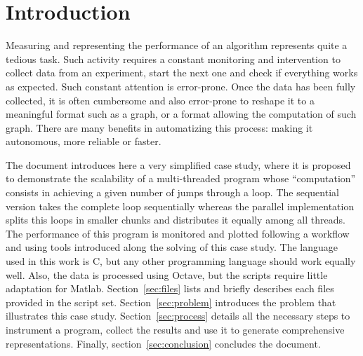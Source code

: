 \section{Introduction}
Measuring and representing the performance of an algorithm represents quite a tedious task. Such activity requires a constant monitoring and intervention to collect data from an experiment, start the next one and check if everything works as expected. Such constant attention is error-prone. Once the data has been fully collected, it is often cumbersome and also error-prone to reshape it to a meaningful format such as a graph, or a format allowing the computation of such graph. There are many benefits in automatizing this process: making it autonomous, more reliable or faster.

The document introduces here a very simplified case study, where it is proposed to demonstrate the scalability of a multi-threaded program whose ``computation'' consists in achieving a given number of jumps through a loop. The sequential version takes the complete loop sequentially whereas the parallel implementation splits this loops in smaller chunks and distributes it equally among all threads. The performance of this program is monitored and plotted following a workflow and using tools introduced along the solving of this case study. The language used in this work is {C}, but any other programming language should work equally well. Also, the data is processed using Octave, but the scripts require little adaptation for Matlab. Section~\ref{sec:files} lists and briefly describes each files provided in the script set. Section~\ref{sec:problem} introduces the problem that illustrates this case study. Section~\ref{sec:process} details all the necessary steps to instrument a program, collect the results and use it to generate comprehensive representations. Finally, section~\ref{sec:conclusion} concludes the document.


